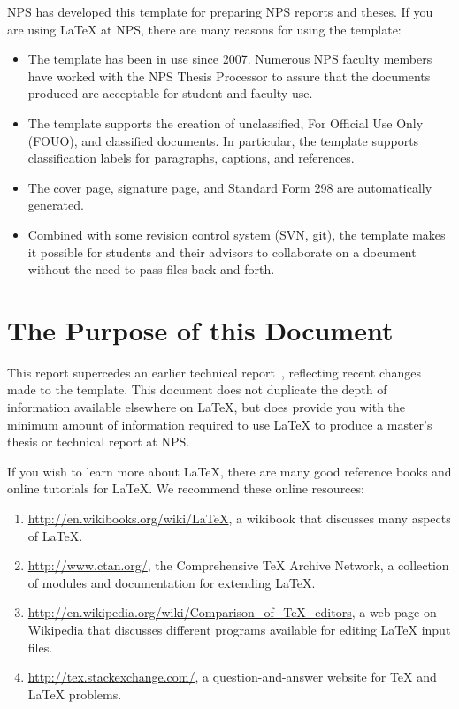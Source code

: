 NPS has developed this template for preparing NPS reports and theses. 
If you are using \LaTeX{} at NPS, there are many reasons for using the template:

\begin{itemize}

\item The template has been in use since 2007. Numerous NPS faculty members
  have worked with the NPS Thesis Processor to assure that the documents
  produced are acceptable for student and faculty use.

\item The template supports the creation of unclassified, For Official Use Only
  (FOUO), and classified documents. In particular, the template supports
  classification labels for paragraphs, captions, and references.

\item The cover page, signature page, and Standard Form 298 are automatically
  generated.

\item Combined with some revision control system (SVN, git), the 
  template makes it possible for students
  and their advisors to collaborate on a document without the need to pass
  files back and forth. 

\end{itemize}


\section{The Purpose of this Document}

This report supercedes an earlier technical report~\cite{nps_tr},
reflecting recent changes made to the template.
This document does not duplicate the depth of information available elsewhere
on \LaTeX{}, but does provide you with the minimum amount of information
required to use \LaTeX{} to produce a master's thesis or technical report at
NPS.

If you wish to learn more about \LaTeX, there are many good reference books and
online tutorials for \LaTeX{}.
We recommend these online resources:
\begin{enumerate}
\item \url{http://en.wikibooks.org/wiki/LaTeX}, a wikibook that
  discusses many aspects of \LaTeX.
\item \url{http://www.ctan.org/}, the Comprehensive \TeX{} Archive
  Network, a collection of modules and documentation for extending \LaTeX{}.
\item \url{http://en.wikipedia.org/wiki/Comparison_of_TeX_editors}, a
  web page on Wikipedia that discusses different programs available for editing \LaTeX{} input files.
\item \url{http://tex.stackexchange.com/}, a question-and-answer website for \TeX{} and \LaTeX{} problems.
\end{enumerate}

